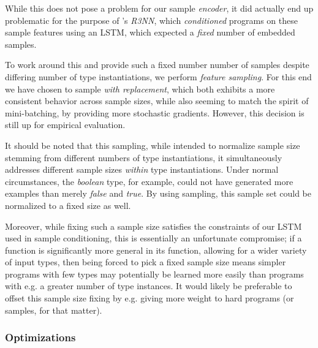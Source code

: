 \documentclass{article}
\begin{document}
    While this does not pose a problem for our sample \emph{encoder},
    it did actually end up problematic for the purpose of \citet{nsps}'s \emph{R3NN},
    which \emph{conditioned} programs on these sample features using an LSTM,
    which expected a \emph{fixed} number of embedded samples.

    To work around this and provide such a fixed number number of samples despite differing number of type instantiations,
    we perform \emph{feature sampling}.
    For this end we have chosen to sample \emph{with replacement},
    which both exhibits a more consistent behavior across sample sizes,
    while also seeming to match the spirit of mini-batching,
    by providing more stochastic gradients.
    However, this decision is still up for empirical evaluation.

    It should be noted that this sampling,
    while intended to normalize sample size stemming from different numbers of type instantiations,
    it simultaneously addresses different sample sizes \emph{within} type instantiations.
    Under normal circumstances, the \emph{boolean} type, for example,
    could not have generated more examples than merely \emph{false} and \emph{true}.
    By using sampling, this sample set could be normalized to a fixed size as well.

    Moreover, while fixing such a sample size satisfies the constraints of our LSTM used in sample conditioning,
    this is essentially an unfortunate compromise;
    if a function is significantly more general in its function,
    allowing for a wider variety of input types,
    then being forced to pick a fixed sample size means simpler programs with few types may potentially be learned more easily than programs with e.g. a greater number of type instances.
    It would likely be preferable to offset this sample size fixing by e.g. giving more weight to hard programs (or samples, for that matter).
    

\subsubsection{Optimizations}
\end{document}
